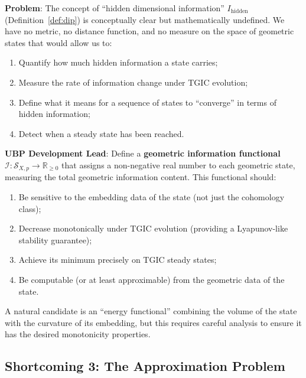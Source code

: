 \documentclass[11pt,a4paper]{article}
\theoremstyle{definition}
\theoremstyle{plain}
\newcommand{\RR}{\mathbb{R}}
\begin{document}
\begin{tcolorbox}[colback=red!5, colframe=red!40!black, title={\textbf{Shortcoming 2: No Information Metric}}]
\textbf{Problem}: The concept of ``hidden dimensional information'' $I_{\mathrm{hidden}}$ (Definition~\ref{def:dip}) is conceptually clear but mathematically undefined. We have no metric, no distance function, and no measure on the space of geometric states that would allow us to:
\begin{enumerate}[nosep]
\item Quantify how much hidden information a state carries;
\item Measure the rate of information change under TGIC evolution;
\item Define what it means for a sequence of states to ``converge'' in terms of hidden information;
\item Detect when a steady state has been reached.
\end{enumerate}

\medskip
\textbf{UBP Development Lead}: Define a \textbf{geometric information functional} $\mathcal{I}: \mathcal{S}_{X,p} \to \RR_{\geq 0}$ that assigns a non-negative real number to each geometric state, measuring the total geometric information content. This functional should:
\begin{enumerate}[nosep]
\item Be sensitive to the embedding data of the state (not just the cohomology class);
\item Decrease monotonically under TGIC evolution (providing a Lyapunov-like stability guarantee);
\item Achieve its minimum precisely on TGIC steady states;
\item Be computable (or at least approximable) from the geometric data of the state.
\end{enumerate}

A natural candidate is an ``energy functional'' combining the volume of the state with the curvature of its embedding, but this requires careful analysis to ensure it has the desired monotonicity properties.
\end{tcolorbox}

\subsection{Shortcoming 3: The Approximation Problem}\label{sec:sc3}
\end{document}
